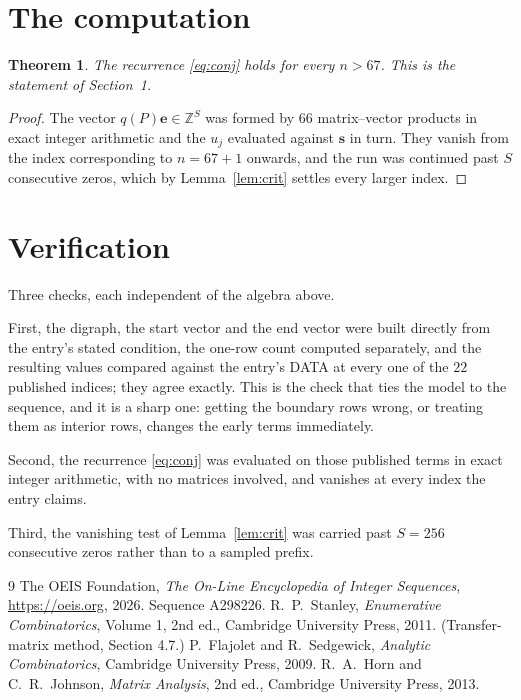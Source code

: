 \documentclass[11pt,a4paper]{article}
\theoremstyle{plain}
\newtheorem{theorem}{Theorem}
\theoremstyle{definition}
\begin{document}
\section{The computation}

\begin{theorem}
The recurrence \eqref{eq:conj} holds for every $n>67$. This is the statement of
Section~1.
\end{theorem}

\begin{proof}
The vector $q(P)\mathbf{e}\in\mathbb{Z}^{S}$ was formed by $66$ matrix--vector
products in exact integer arithmetic and the $u_j$ evaluated against $\mathbf{s}$ in turn.
They vanish from the index corresponding to $n=67+1$ onwards, and the run was continued
past $S$ consecutive zeros, which by Lemma~\ref{lem:crit} settles every larger index.
\end{proof}

\section{Verification}

Three checks, each independent of the algebra above.

First, the digraph, the start vector and the end vector were built directly from the
entry's stated condition, the one-row count computed separately, and the resulting values
compared against the entry's DATA at every one of the $22$ published indices; they
agree exactly. This is the check that ties the model to the sequence, and it is a sharp one:
getting the boundary rows wrong, or treating them as interior rows, changes the early terms
immediately.

Second, the recurrence \eqref{eq:conj} was evaluated on those published terms in exact
integer arithmetic, with no matrices involved, and vanishes at every index the entry claims.

Third, the vanishing test of Lemma~\ref{lem:crit} was carried past $S=256$ consecutive
zeros rather than to a sampled prefix.

\begin{thebibliography}{9}
 The OEIS Foundation, \emph{The On-Line Encyclopedia of Integer
Sequences}, \url{https://oeis.org}, 2026. Sequence A298226.
 R.~P.~Stanley, \emph{Enumerative Combinatorics}, Volume 1, 2nd ed.,
Cambridge University Press, 2011. (Transfer-matrix method, Section 4.7.)
 P.~Flajolet and R.~Sedgewick, \emph{Analytic Combinatorics}, Cambridge
University Press, 2009.
 R.~A.~Horn and C.~R.~Johnson, \emph{Matrix Analysis}, 2nd ed., Cambridge
University Press, 2013.
\end{thebibliography}
\end{document}
